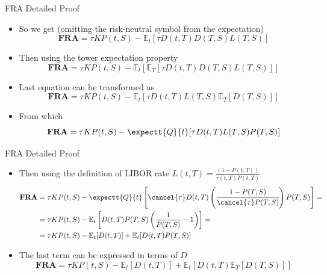 \documentclass{beamer}
\begin{document}
\begin{frame}{FRA Detailed Proof}
	\begin{itemize}
		\item<1-> So we get (omitting the risk-neutral symbol from the expectation)
		\begin{equation*}
			\textbf{FRA} = \tau KP(t,S)-\mathbb{E}_t[\tau D(t,T)D(T,S)L(T,S)]
		\end{equation*}
		\item<2-> Then using the tower expectation property
		\begin{equation*}
		\textbf{FRA} = \tau KP(t,S) - \mathbb{E}_t[\mathbb{E}_T[\tau D(t,T)D(T,S)L(T,S)]]
		\end{equation*}
		\item<3-> Last equation can be transformed as
		\begin{equation*}
			\textbf{FRA} = \tau KP(t,S) - \mathbb{E}_t[\tau D(t,T)L(T,S)\mathbb{E}_T[D(T,S)]]
		\end{equation*}
		\item<4-> From which
		\begin{equation*}
		\textbf{FRA} = \tau KP(t,S) - \expectt{Q}{t}[\tau D(t,T)L(T,S)P(T,S)]
		\end{equation*}
	\end{itemize}
\end{frame}

\begin{frame}{FRA Detailed Proof}
	\begin{itemize}
		\item<1-> Then using the definition of LIBOR rate $L(t,T)=\frac{(1-P(t,T))}{\tau(t,T)P(t,T)}$
		\begin{equation*}
			\begin{aligned}
			\textbf{FRA} &= \tau KP(t,S) - \expectt{Q}{t}\left[\cancel{\tau}D(t,T)\left(\cfrac{1-P(T,S)}{\cancel{\tau} P(T,S)}\right)P(T,S)\right] = \\
			&=\tau KP(t,S)-\mathbb{E}_t\left[D(t,T)P(T,S)\left(\frac{1}{P(T,S)}-1\right)\right]= \\
			&=\tau KP(t,S)-\mathbb{E}_t[D(t,T)] + \mathbb{E}_t[D(t,T)P(T,S)]
			\end{aligned}
		\end{equation*}
		\item<2-> The last term can be expressed in terms of $D$
		\begin{equation*}
			\textbf{FRA} = \tau KP(t,S)-\mathbb{E}_t[D(t,T)] + \mathbb{E}_t\left[D(t,T)\mathbb{E}_T[D(T,S)]\right]
		\end{equation*}		
	\end{itemize}
\end{frame}
\end{document}
